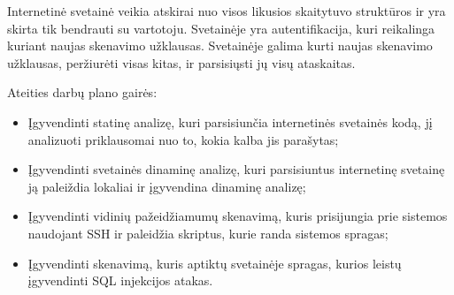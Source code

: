 \documentclass[a4paper,12pt,fleqn]{article}
\begin{document}
 Internetinė svetainė veikia atskirai nuo visos likusios skaitytuvo struktūros ir yra skirta tik bendrauti su vartotoju. Svetainėje yra autentifikacija, kuri reikalinga kuriant naujas skenavimo užklausas. Svetainėje galima kurti naujas skenavimo užklausas, peržiurėti visas kitas, ir parsisiųsti jų visų ataskaitas. 
 




Ateities darbų plano gairės:

\begin{itemize}
	\item Įgyvendinti statinę analizę, kuri parsisiunčia internetinės svetainės kodą, jį analizuoti priklausomai nuo to, kokia kalba jis parašytas;
	\item Įgyvendinti svetainės dinaminę analizę, kuri parsisiuntus internetinę svetainę ją paleiždia lokaliai ir įgyvendina dinaminę analizę;
	\item Įgyvendinti vidinių pažeidžiamumų skenavimą, kuris prisijungia prie sistemos naudojant SSH ir paleidžia skriptus, kurie randa sistemos spragas;
	\item Įgyvendinti skenavimą, kuris aptiktų svetainėje spragas, kurios leistų įgyvendinti SQL injekcijos atakas.
\end{itemize}


%



\end{document}
